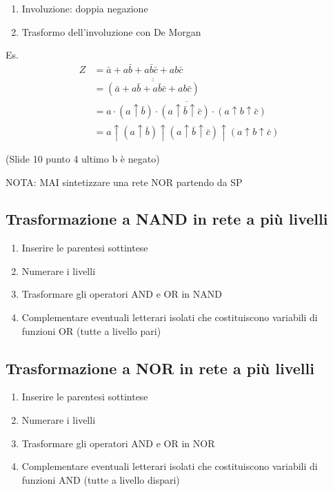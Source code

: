 \documentclass{article}
\begin{document}
\begin{enumerate}
    \item Involuzione: doppia negazione
    \item Trasformo dell'involuzione con De Morgan
\end{enumerate}

Es.
\[
    \begin{split}
        Z &= \bar{a} + a \bar{b} + a\bar{b}\bar{c} + ab\bar{c} \\
        &= \overline{\overline{( \bar{a} + a \bar{b} + a\bar{b}\bar{c} + ab\bar{c} )}}\\
        &= \overline{a \cdot (a \uparrow \bar{b}) \cdot(a \uparrow \bar{b} \uparrow \bar{c}) \cdot (a \uparrow b \uparrow \bar{c})} \\
        &= a \uparrow (a \uparrow \bar{b}) \uparrow(a \uparrow \bar{b} \uparrow \bar{c}) \uparrow (a \uparrow b \uparrow \bar{c})
    \end{split}
\]

(Slide 10 punto 4 ultimo b è negato)

NOTA: MAI sintetizzare una rete NOR partendo da SP
\subsection{Trasformazione a NAND in rete a più livelli}
\begin{enumerate}
    \item Inserire le parentesi sottintese
    \item Numerare i livelli
    \item Trasformare gli operatori AND e OR in NAND
    \item Complementare eventuali letterari isolati che costituiscono variabili di funzioni OR (tutte a livello pari)
\end{enumerate}

\subsection{Trasformazione a NOR in rete a più livelli}
\begin{enumerate}
    \item Inserire le parentesi sottintese
    \item Numerare i livelli
    \item Trasformare gli operatori AND e OR in NOR
    \item Complementare eventuali letterari isolati che costituiscono variabili di funzioni AND (tutte a livello dispari)
\end{enumerate}
\end{document}
